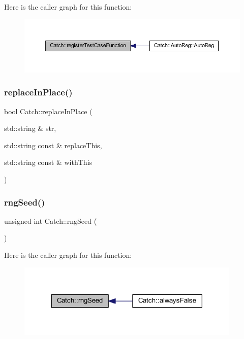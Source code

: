 Here is the caller graph for this function\+:\nopagebreak
\begin{figure}[H]
\begin{center}
\leavevmode
\includegraphics[width=350pt]{namespace_catch_a220159aeff47f9c5231e893f2abbc643_icgraph}
\end{center}
\end{figure}
\hypertarget{namespace_catch_afe4e6770da547e43e9e4eeaa05f946ea}{}\label{namespace_catch_afe4e6770da547e43e9e4eeaa05f946ea} 
\subsubsection{\texorpdfstring{replace\+In\+Place()}{replaceInPlace()}}
{\footnotesize\ttfamily bool Catch\+::replace\+In\+Place (\begin{DoxyParamCaption}\item[{std\+::string \&}]{str,  }\item[{std\+::string const \&}]{replace\+This,  }\item[{std\+::string const \&}]{with\+This }\end{DoxyParamCaption})}

\hypertarget{namespace_catch_acf5ea05e942d2d7fe79111e12754ed76}{}\label{namespace_catch_acf5ea05e942d2d7fe79111e12754ed76} 
\subsubsection{\texorpdfstring{rng\+Seed()}{rngSeed()}}
{\footnotesize\ttfamily unsigned int Catch\+::rng\+Seed (\begin{DoxyParamCaption}{ }\end{DoxyParamCaption})}

Here is the caller graph for this function\+:\nopagebreak
\begin{figure}[H]
\begin{center}
\leavevmode
\includegraphics[width=302pt]{namespace_catch_acf5ea05e942d2d7fe79111e12754ed76_icgraph}
\end{center}
\end{figure}
\hypertarget{namespace_catch_a161400810eb0995394d6d8d3cae821ad}{}\label{namespace_catch_a161400810eb0995394d6d8d3cae821ad} 
